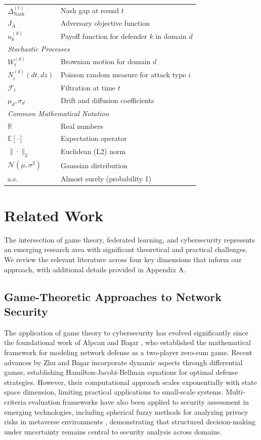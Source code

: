 \documentclass[12pt,a4paper]{article}
\newcommand{\rev}[1]{\textcolor{revcolor}{#1}}
\theoremstyle{definition}
\begin{document}
\begin{longtable}{@{}ll@{}}
$\Delta_{\text{Nash}}^{(t)}$ & Nash gap at round $t$ \\
$J_A$ & Adversary objective function \\
$u_k^{(d)}$ & Payoff function for defender $k$ in domain $d$ \\
\midrule
\multicolumn{2}{l}{\textit{Stochastic Processes}} \\
$W_t^{(d)}$ & Brownian motion for domain $d$ \\
$N_i^{(d)}(dt, dz)$ & Poisson random measure for attack type $i$ \\
$\mathcal{F}_t$ & Filtration at time $t$ \\
$\mu_d, \sigma_d$ & Drift and diffusion coefficients \\
\midrule
\multicolumn{2}{l}{\textit{Common Mathematical Notation}} \\
$\mathbb{R}$ & Real numbers \\
$\mathbb{E}[\cdot]$ & Expectation operator \\
$\|\cdot\|_2$ & Euclidean (L2) norm \\
$\mathcal{N}(\mu, \sigma^2)$ & Gaussian distribution \\
a.s. & Almost surely (probability 1) \\
\end{longtable}
\endgroup

\section{Related Work}

The intersection of game theory, federated learning, and cybersecurity represents an emerging research area with significant theoretical and practical challenges. We review the relevant literature across four key dimensions that inform our approach, with additional details provided in Appendix A.

\subsection{Game-Theoretic Approaches to Network Security}

The application of game theory to cybersecurity has evolved significantly since the foundational work of Alpcan and Başar \cite{alpcan2011network}, who established the mathematical framework for modeling network defense as a two-player zero-sum game. Recent advances by Zhu and Başar \cite{zhu2015game} incorporate dynamic aspects through differential games, establishing Hamilton-Jacobi-Bellman equations for optimal defense strategies. However, their computational approach scales exponentially with state space dimension, limiting practical applications to small-scale systems. \rev{Multi-criteria evaluation frameworks have also been applied to security assessment in emerging technologies, including spherical fuzzy methods for analyzing privacy risks in metaverse environments \cite{hezam2024evaluation}, demonstrating that structured decision-making under uncertainty remains central to security analysis across domains.}
\end{document}
